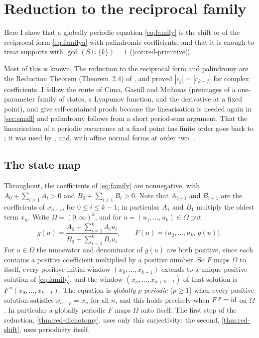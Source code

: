 \section{Reduction to the reciprocal family}
\label{sec:reduction}

Here I show that a globally periodic equation \eqref{eq:family} is the shift
or of the reciprocal form \eqref{eq:familya} with palindromic coefficients,
and that it is enough to treat supports with $\gcd(S\cup\{k\})=1$
(\autoref{cor:red-primitive}).

Most of this is known. The reduction to the reciprocal form and palindromy
are the Reduction Theorem (Theorem~2.4) of \citet{CimaGasullManosas2004}, and
\citet[Theorem~4]{CsornyeiLaczkovich2001} proved $|c_j|=|c_{k-j}|$ for
complex coefficients. I follow the route of Cima, Gasull and Ma\~nosas
(preimages of a one-parameter family of states, a Lyapunov function, and the
derivative at a fixed point), and give self-contained proofs because the
linearisation is needed again in \autoref{sec:small} and palindromy follows
from a short period-sum argument. That the linearisation of a periodic
recurrence at a fixed point has finite order goes back to
\citet[Theorem~3.2]{KurshanGopinath1974}; it was used by
\citet{KocicLadasRodrigues1993}, \citet[Lemma~2]{CsornyeiLaczkovich2001} and,
with affine normal forms at order two, \citet{RubioMasseguManosa2007}.

\subsection{The state map}

Throughout, the coefficients of \eqref{eq:family} are nonnegative, with
$A_0+\sum_{i\ge1}A_i>0$ and $B_0+\sum_{i\ge1}B_i>0$. Note that $A_{i+1}$ and
$B_{i+1}$ are the coefficients of $x_{n+i}$, for $0\le i\le k-1$; in particular
$A_1$ and $B_1$ multiply the oldest term $x_n$. Write
$\Omega=(0,\infty)^k$, and for $u=(u_1,\dots,u_k)\in\Omega$ put
\begin{equation}
g(u)=\frac{A_0+\sum_{i=1}^kA_iu_i}{B_0+\sum_{i=1}^kB_iu_i},
\qquad
F(u)=\bigl(u_2,\dots,u_k,\,g(u)\bigr).
\end{equation}
For $u\in\Omega$ the numerator and denominator of $g(u)$ are both positive,
since each contains a positive coefficient multiplied by a positive number. So
$F$ maps $\Omega$ to itself, every positive initial window
$(x_0,\dots,x_{k-1})$ extends to a unique positive solution of
\eqref{eq:family}, and the window $(x_n,\dots,x_{n+k-1})$ of that solution is
$F^{\,n}(x_0,\dots,x_{k-1})$. The equation is \textit{globally $p$-periodic}
($p\ge1$) when every positive solution satisfies $x_{n+p}=x_n$ for all $n$, and
this holds precisely when $F^{\,p}=\mathrm{id}$ on $\Omega$. In particular a globally
periodic $F$ maps $\Omega$ onto itself. The first step of the reduction,
\autoref{thm:red-dichotomy}, uses only this surjectivity; the second,
\autoref{thm:red-shift}, uses periodicity itself.


